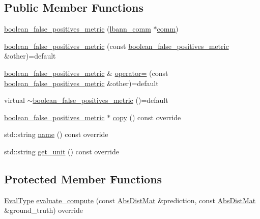 \subsection*{Public Member Functions}
\begin{DoxyCompactItemize}
\item 
\hyperlink{classlbann_1_1boolean__false__positives__metric_a47a4ec4bd3cd0d895f3543cd9ee0ea9b}{boolean\+\_\+false\+\_\+positives\+\_\+metric} (\hyperlink{classlbann_1_1lbann__comm}{lbann\+\_\+comm} $\ast$\hyperlink{file__io_8cpp_ab048c6f9fcbcfaa57ce68b00263dbebe}{comm})
\item 
\hyperlink{classlbann_1_1boolean__false__positives__metric_a2af5389995ebacebc04dc38c13f77738}{boolean\+\_\+false\+\_\+positives\+\_\+metric} (const \hyperlink{classlbann_1_1boolean__false__positives__metric}{boolean\+\_\+false\+\_\+positives\+\_\+metric} \&other)=default
\item 
\hyperlink{classlbann_1_1boolean__false__positives__metric}{boolean\+\_\+false\+\_\+positives\+\_\+metric} \& \hyperlink{classlbann_1_1boolean__false__positives__metric_a7a459f48be67c7a7d4d3bbb71603b3ea}{operator=} (const \hyperlink{classlbann_1_1boolean__false__positives__metric}{boolean\+\_\+false\+\_\+positives\+\_\+metric} \&other)=default
\item 
virtual \hyperlink{classlbann_1_1boolean__false__positives__metric_aa52263b9202a358bb1a2a1d5ce96e4b2}{$\sim$boolean\+\_\+false\+\_\+positives\+\_\+metric} ()=default
\item 
\hyperlink{classlbann_1_1boolean__false__positives__metric}{boolean\+\_\+false\+\_\+positives\+\_\+metric} $\ast$ \hyperlink{classlbann_1_1boolean__false__positives__metric_a5d9544f3f4dc7e086cf203f5666a7660}{copy} () const override
\item 
std\+::string \hyperlink{classlbann_1_1boolean__false__positives__metric_aa1089643938285ab8c563e5aaccf9652}{name} () const override
\item 
std\+::string \hyperlink{classlbann_1_1boolean__false__positives__metric_ab42b53134f128d26e3df37ca7a3d4cea}{get\+\_\+unit} () const override
\end{DoxyCompactItemize}
\subsection*{Protected Member Functions}
\begin{DoxyCompactItemize}
\item 
\hyperlink{base_8hpp_a3266f5ac18504bbadea983c109566867}{Eval\+Type} \hyperlink{classlbann_1_1boolean__false__positives__metric_abb6573a4e32e97316c69ce9fc24214f0}{evaluate\+\_\+compute} (const \hyperlink{base_8hpp_a9a697a504ae84010e7439ffec862b470}{Abs\+Dist\+Mat} \&prediction, const \hyperlink{base_8hpp_a9a697a504ae84010e7439ffec862b470}{Abs\+Dist\+Mat} \&ground\+\_\+truth) override
\end{DoxyCompactItemize}



